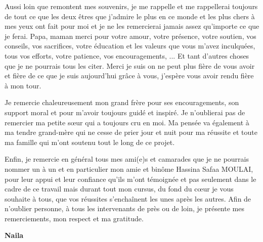 \begin{remerciements}
\vspace{0.2cm}

Aussi loin que remontent mes souvenirs, je me rappelle et me rappellerai toujours de tout ce que les deux êtres que j'admire le plus en ce monde et les plus chers à mes yeux ont fait pour moi et je ne les remercierai jamais assez qu'importe ce que je ferai. Papa, maman merci pour votre amour, votre présence, votre soutien, vos conseils, vos sacrifices, votre éducation et les valeurs que vous m'avez inculquées, tous vos efforts, votre patience, vos encouragements,  ... Et tant d'autres choses que je ne pourrais tous les citer. Merci je suis on ne peut plus fière de vous avoir et fière de ce que je suis aujourd'hui grâce à vous, j'espère vous avoir rendu fière à mon tour.


Je remercie chaleureusement mon grand frère pour ses encouragements, son support moral et pour m'avoir toujours guidé et inspiré. Je n'oublierai pas de remercier ma petite sœur qui a toujours cru en moi.
Ma pensée va également à ma tendre grand-mère qui ne cesse de prier jour et nuit pour ma réussite et toute ma famille qui m'ont soutenu tout le long de ce projet.

\vspace{0.2cm}


Enfin, je remercie en général tous mes ami(e)s et camarades que je ne pourrais nommer un à un et en particulier mon amie et binôme Hassina Safaa MOULAI, pour leur appui et leur confiance qu'ils m'ont témoignée et pas seulement dans le cadre de ce travail mais durant tout mon cursus, du fond du cœur je vous souhaite à tous, que vos réussites s'enchaînent les unes après les autres.
Afin de n'oublier personne, à tous les intervenants de près ou de loin, je présente mes remerciements, mon respect et ma gratitude.
\end{remerciements}
\thispagestyle{empty}%

%


\vspace{-0.3cm}
\begin{center}
\Large
\hspace{12.5cm}
\textbf{Naila}
\end{center}
